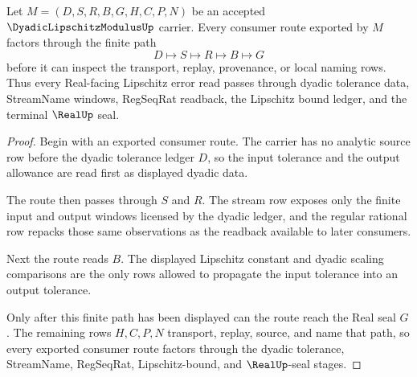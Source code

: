\begin{theorem}
\label{thm:dyadic-lipschitz-modulus-regseqrat-handoff}
Let $M=(D,S,R,B,G,H,C,P,N)$ be an accepted $\DyadicLipschitzModulusUp$ carrier. Every consumer route exported by $M$ factors through the finite path
$$
D\longmapsto S\longmapsto R\longmapsto B\longmapsto G
$$
before it can inspect the transport, replay, provenance, or local naming rows. Thus every Real-facing Lipschitz error read passes through dyadic tolerance data, StreamName windows, RegSeqRat readback, the Lipschitz bound ledger, and the terminal $\RealUp$ seal.
\end{theorem}
\begin{proof}
Begin with an exported consumer route. The carrier has no analytic source row before the dyadic tolerance ledger $D$, so the input tolerance and the output allowance are read first as displayed dyadic data.

The route then passes through $S$ and $R$. The stream row exposes only the finite input and output windows licensed by the dyadic ledger, and the regular rational row repacks those same observations as the readback available to later consumers.

Next the route reads $B$. The displayed Lipschitz constant and dyadic scaling comparisons are the only rows allowed to propagate the input tolerance into an output tolerance.

Only after this finite path has been displayed can the route reach the Real seal $G$. The remaining rows $H,C,P,N$ transport, replay, source, and name that path, so every exported consumer route factors through the dyadic tolerance, StreamName, RegSeqRat, Lipschitz-bound, and $\RealUp$-seal stages.
\end{proof}


\begin{closurestatus}{\DyadicLipschitzModulusUp}
  \theoryclosure{\seedClosure}
  \formalstatus{\unformalizedV}
\end{closurestatus}
